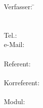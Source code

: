 
\title{\haupttitel }
\author{\verfasser}
\date{\today}


\pagestyle {fancy}

\fancyhead[L]{\fontsize{10pt}{12pt}\selectfont\verfasser}
\fancyhead[C]{}
\fancyhead[R]{}

\fancyfoot[L]{}
\fancyfoot[C]{}
\fancyfoot[R]{}




\pagestyle{empty}

\begin{center}
    \LARGE
    \vspace{4cm}
    
    {\huge\bfseries \haupttitel \par}
	\vspace{1cm}
	{\bfseries \untertitel \par}

\end{center}

\vspace*{\fill}

\begin{tabbing}

	Verfasser\verfassergen :  
	\hspace{2.5cm}  \= \verfasser \\
	\> \strasse \\
	\> \ort \\
	\> Tel.: \tel \\
	\> e-Mail: \mail \\
	 \\

	Referent :
	\>  \\
	\\
	
	Korreferent\korreferentgen :
	\> \korreferent \\
	\\
	
	Modul:
	\> \modul \\
	\\
\end{tabbing}

\ \\
\centerline{\textbf{\titlefooter}}



    \newpage
    
     \pagestyle{fancy}

